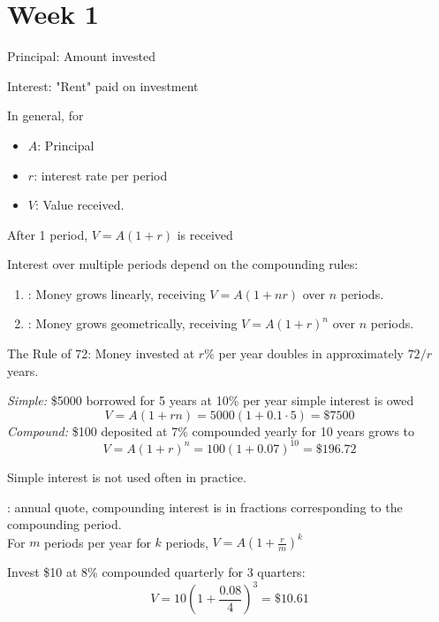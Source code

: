 
\section{Week 1}

\begin{definition}
    Principal: Amount invested

    Interest: "Rent" paid on investment
\end{definition}

In general, for
\begin{itemize}
    \item $A$: Principal
    \item $r$: interest rate per period
    \item $V$: Value received.
\end{itemize}
After 1 period, $V=A(1+r)$ is received

Interest over multiple periods depend on the compounding rules:
\begin{enumerate}
    \item {}: Money grows linearly, receiving $V=A(1+nr)$ over $n$ periods.
    \item {}: Money grows geometrically, receiving $V=A(1+r)^n$ over $n$ periods.
\end{enumerate}

The Rule of 72: Money invested at $r\%$ per year doubles in approximately $72/r$ years.

\begin{example}
    \textit{Simple:} \$5000 borrowed for 5 years at 10\% per year simple interest is owed
    \[V = A(1+rn) = 5000(1+0.1\cdot 5) = \$7500\]
    \textit{Compound:} \$100 deposited at 7\% compounded yearly for 10 years grows to
    \[V = A(1+r)^n = 100(1+0.07)^{10} = \$196.72\]
\end{example}
Simple interest is not used often in practice.


\begin{definition}
    : annual quote, compounding interest is in fractions corresponding to the compounding period.
    \\For $m$ periods per year for $k$ periods, $V=A(1+\frac{r}{m})^k$
\end{definition}

\begin{example}
    Invest \$10 at 8\% compounded quarterly for 3 quarters:
    \[V = 10\left(1+\frac{0.08}{4}\right)^3 = \$10.61\]
\end{example}

